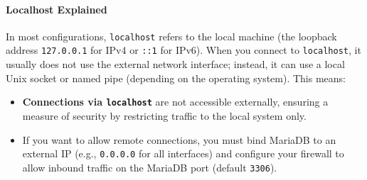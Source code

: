 \documentclass[10pt]{article}
\begin{document}
\paragraph{Localhost Explained}
In most configurations, \texttt{localhost} refers to the local machine (the loopback address \texttt{127.0.0.1} for IPv4 or \texttt{::1} for IPv6). When you connect to \texttt{localhost}, it usually does not use the external network interface; instead, it can use a local Unix socket or named pipe (depending on the operating system). This means:
\begin{itemize}
    \item \textbf{Connections via \texttt{localhost}} are not accessible externally, ensuring a measure of security by restricting traffic to the local system only.
    \item If you want to allow remote connections, you must bind MariaDB to an external IP (e.g., \texttt{0.0.0.0} for all interfaces) and configure your firewall to allow inbound traffic on the MariaDB port (default \texttt{3306}).
\end{itemize}
\end{document}

